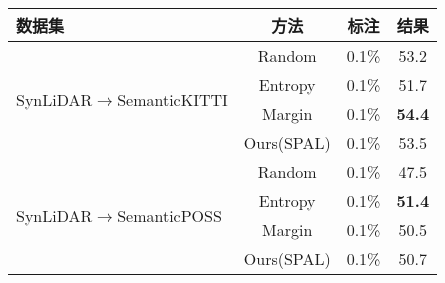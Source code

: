 \begin{table}[H]
	\renewcommand{\arraystretch}{1}
    \centering
    \setlength{\tabcolsep}{10mm}
    \label{tab:3-5}
    \wuhao
    \begin{tabular}{lccc}
        \toprule[1.5pt]
        \textbf{数据集} & \textbf{方法} & \textbf{标注} & \textbf{结果} \\
        \midrule
        \multirow{4}{*}{SynLiDAR\(\to\)SemanticKITTI} & 
        Random              & 0.1\%        & 53.2 \\
        ~ & Entropy             & 0.1\%        & 51.7 \\
        ~ & Margin              & 0.1\%        & \textbf{54.4} \\
        ~ & Ours(SPAL)          & 0.1\%        & 53.5 \\
        \multirow{4}{*}{SynLiDAR\(\to\)SemanticPOSS} & 
        Random              & 0.1\%        & 47.5 \\
        ~ & Entropy             & 0.1\%        & \textbf{51.4} \\
        ~ & Margin              & 0.1\%        & 50.5 \\
        ~ & Ours(SPAL)          & 0.1\%        & 50.7 \\
        \bottomrule[1.5pt]
    \end{tabular}
\end{table}